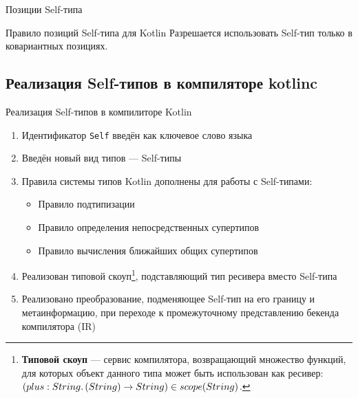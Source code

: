 \documentclass[handout,aspectratio=169,usenames,dvipsnames]{beamer}
\begin{document}
\begin{frame}{Позиции Self-типа}
        \pause

        \begin{block}{Правило позиций Self-типа для Kotlin}
            Разрешается использовать Self-тип только в ковариантных позициях.
        \end{block}
    \end{frame}


    \subsection{Реализация Self-типов в компиляторе kotlinc}

    \begin{frame}{Реализация Self-типов в компилиторе Kotlin}

        \begin{enumerate}
            \item Идентификатор \texttt{Self} введён как ключевое слово языка
            \item Введён новый вид типов --- Self-типы
            \item Правила системы типов Kotlin дополнены для работы с Self-типами:
            \begin{itemize}
                \item Правило подтипизации
                \item Правило определения непосредственных супертипов
                \item Правило вычисления ближайших общих супертипов
            \end{itemize}
            \item Реализован типовой скоуп\footnote{\textbf{Типовой скоуп} --- сервис компилятора, возвращающий множество функций, для которых объект данного типа может быть использован как ресивер: $(plus : String\ldotp(String) \to String) \in scope(String)$.}, подставляющий тип ресивера вместо Self-типа
            \item Реализовано преобразование, подменяющее Self-тип на его границу и метаинформацию, при переходе к промежуточному представлению бекенда компилятора (IR)
        \end{enumerate}
    \end{frame}
\end{document}
